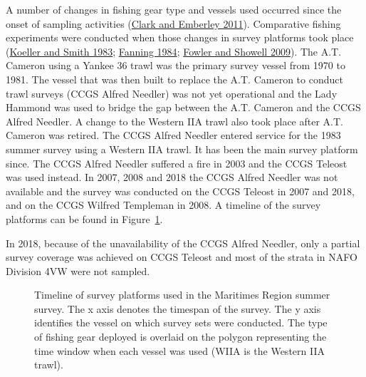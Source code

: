 \documentclass[12pt]{article}\usepackage[]{graphicx}\usepackage[]{color}
\begin{document}
A number of changes in fishing gear type and vessels used occurred since the onset of sampling activities (\protect\hyperlink{ref-ClarkEmberley2011}{Clark and Emberley 2011}). Comparative fishing experiments were conducted when those changes in survey platforms took place (\protect\hyperlink{ref-Koeller-Smith-1983}{Koeller and Smith 1983}; \protect\hyperlink{ref-Fanning-1984}{Fanning 1984}; \protect\hyperlink{ref-Fowler-Showell-2009}{Fowler and Showell 2009}). The A.T. Cameron using a Yankee 36 trawl was the primary survey vessel from 1970 to 1981. The vessel that was then built to replace the A.T. Cameron to conduct trawl surveys (CCGS Alfred Needler) was not yet operational and the Lady Hammond was used to bridge the gap between the A.T. Cameron and the CCGS Alfred Needler. A change to the Western IIA trawl also took place after A.T. Cameron was retired. The CCGS Alfred Needler entered service for the 1983 summer survey using a Western IIA trawl. It has been the main survey platform since. The CCGS Alfred Needler suffered a fire in 2003 and the CCGS Teleost was used instead. In 2007, 2008 and 2018 the CCGS Alfred Needler was not available and the survey was conducted on the CCGS Teleost in 2007 and 2018, and on the CCGS Wilfred Templeman in 2008. A timeline of the survey platforms can be found in Figure~\ref{fig:timeline}.

In 2018, because of the unavailability of the CCGS Alfred Needler, only a partial survey coverage was achieved on CCGS Teleost and most of the strata in NAFO Division 4VW were not sampled.


\begin{figure}[htb]

{\centering {} 

}

\caption{Timeline of survey platforms used in the Maritimes Region summer survey. The x axis denotes the timespan of the survey. The y axis identifies the vessel on which survey sets were conducted. The type of fishing gear deployed is overlaid on the polygon representing the time window when each vessel was used (WIIA is the Western IIA trawl).}\label{fig:timeline}
\end{figure}
\end{document}
